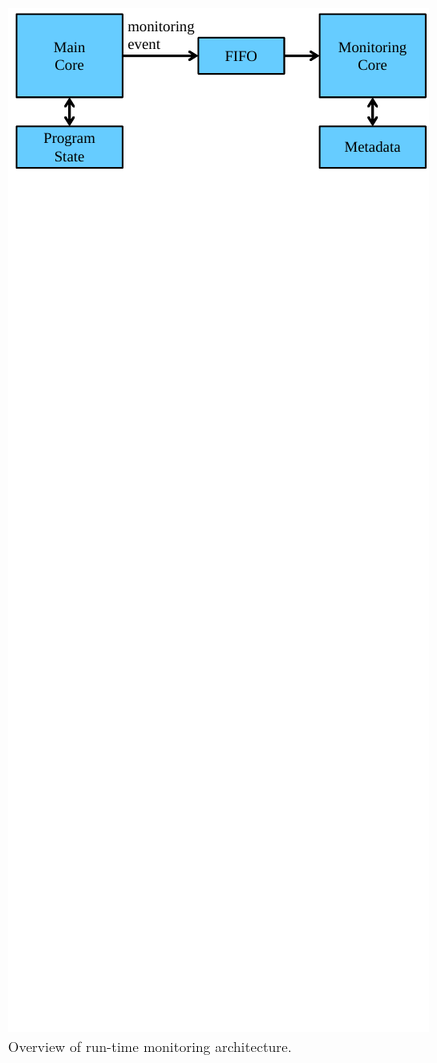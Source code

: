 \begin{figure}
  \begin{center}
    \includegraphics[width=\columnwidth]{figs/monitoring_architecture.pdf}
    \vspace{-0.2in}
    \caption{Overview of run-time monitoring architecture.}
    \label{fig:monitoring.overview} 
    \vspace{-0.1in}
  \end{center}
\end{figure}

